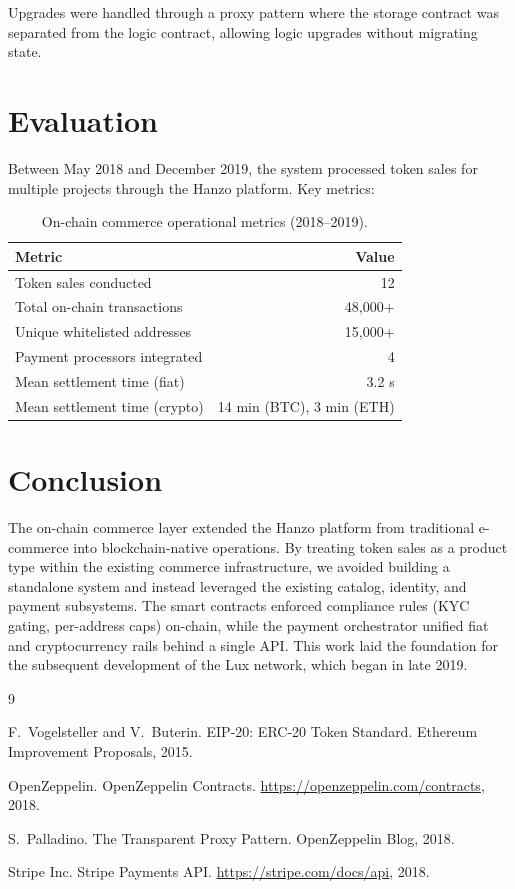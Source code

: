 \documentclass[11pt,a4paper]{article}
\begin{document}
Upgrades were handled through a proxy pattern where the storage contract was separated from the logic contract, allowing logic upgrades without migrating state.

\section{Evaluation}

Between May 2018 and December 2019, the system processed token sales for multiple projects through the Hanzo platform. Key metrics:

\begin{table}[h]
\centering
\caption{On-chain commerce operational metrics (2018--2019).}
\begin{tabular}{lr}
\toprule
\textbf{Metric} & \textbf{Value} \\
\midrule
Token sales conducted  & 12 \\
Total on-chain transactions & 48{,}000+ \\
Unique whitelisted addresses & 15{,}000+ \\
Payment processors integrated & 4 \\
Mean settlement time (fiat) & 3.2 s \\
Mean settlement time (crypto) & 14 min (BTC), 3 min (ETH) \\
\bottomrule
\end{tabular}
\end{table}

\section{Conclusion}

The on-chain commerce layer extended the Hanzo platform from traditional e-commerce into blockchain-native operations. By treating token sales as a product type within the existing commerce infrastructure, we avoided building a standalone system and instead leveraged the existing catalog, identity, and payment subsystems. The smart contracts enforced compliance rules (KYC gating, per-address caps) on-chain, while the payment orchestrator unified fiat and cryptocurrency rails behind a single API. This work laid the foundation for the subsequent development of the Lux network, which began in late 2019.


\begin{thebibliography}{9}

F.~Vogelsteller and V.~Buterin. EIP-20: ERC-20 Token Standard. Ethereum Improvement Proposals, 2015.

OpenZeppelin. OpenZeppelin Contracts. \url{https://openzeppelin.com/contracts}, 2018.

S.~Palladino. The Transparent Proxy Pattern. OpenZeppelin Blog, 2018.

Stripe Inc. Stripe Payments API. \url{https://stripe.com/docs/api}, 2018.

\end{thebibliography}
\end{document}
